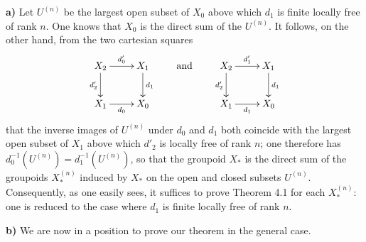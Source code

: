 \textbf{a)} Let $U^{(n)}$ be the largest open subset of $X_0$ above which $d_1$ is finite locally free of rank $n$. One knows that $X_0$ is the direct sum of the $U^{(n)}$. It follows, on the other hand, from the two cartesian squares
\[
\xymatrix{X_2\ar[r]^{d'_0}\ar[d]_{d'_2}&X_1\ar[d]^{d_1}\\X_1\ar[r]_{d_0}&X_0}
\qquad\text{and}\qquad
\xymatrix{X_2\ar[r]^{d'_1}\ar[d]_{d'_2}&X_1\ar[d]^{d_1}\\X_1\ar[r]_{d_1}&X_0}
\]
that the inverse images of $U^{(n)}$ under $d_0$ and $d_1$ both coincide with the largest open subset of $X_1$ above which $d'_2$ is locally free of rank $n$; one therefore has $d_0^{-1}(U^{(n)})=d_1^{-1}(U^{(n)})$, so that the groupoid $X_*$ is the direct sum of the groupoids $X_*^{(n)}$ induced by $X_*$ on the open and closed subsets $U^{(n)}$. Consequently, as one easily sees, it suffices to prove Theorem 4.1 for each $X_*^{(n)}$: one is reduced to the case where $d_1$ is finite locally free of rank $n$.

\textbf{b)} We are now in a position to prove our theorem in the general case.

